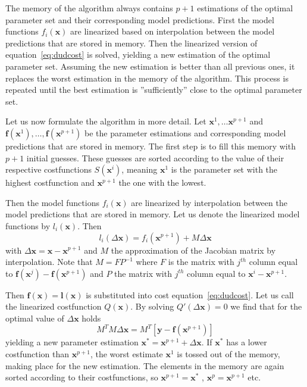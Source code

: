 The memory of the algorithm always contains $p + 1$ estimations of the optimal
parameter set and their corresponding model predictions. First the model
functions $f_i(\mathbf{x})$ are linearized based on interpolation between the
model predictions that are stored in memory. Then the linearized version of
equation~\ref{eq:dudcost} is solved, yielding a new estimation of the optimal
parameter set. Assuming the new estimation is better than all previous ones,
it replaces the worst estimation in the memory of the algorithm. This process
is repeated until the best estimation is ”sufficiently” close to the optimal
parameter set.

Let us now formulate the algorithm in more detail. Let $\mathbf{x}^1 , \ldots
\mathbf{x}^{p+1}$ and
$\mathbf{f}(\mathbf{x}^1), \ldots, \mathbf{f}(\mathbf{x}^{p+1})$ be the
parameter estimations and corresponding model predictions that are stored in
memory. The first step is to fill this memory with $p+1$ initial guesses. These
guesses are sorted according to the value of their respective costfunctions
$S(\mathbf{x}^i)$, meaning $\mathbf{x}^1$ is the parameter set with the highest
costfunction and $\mathbf{x}^{p+1}$ the one with the lowest.

Then the model functions $f_i(\mathbf{x})$ are linearized by interpolation
between the model predictions that are stored in memory. Let us denote the
linearized model functions by $l_i(\mathbf{x})$. Then
\begin{equation}
l_i (\Delta \mathbf{x}) = f_i(\mathbf{x}^{p+1}) + M \Delta \mathbf{x}
\end{equation}
with $\Delta \mathbf{x} = \mathbf{x} - \mathbf{x}^{p+1}$ and $M$ the
approximation of the Jacobian matrix by interpolation. Note that $M = F P^{−1}$
where $F$ is the matrix with $j^{th}$ column equal to $\mathbf{f}(\mathbf{x}^j)
- \mathbf{f}(\mathbf{x}^{p+1})$ and $P$ the matrix with $j^{th}$ column equal
to $\mathbf{x}^i - \mathbf{x}^{p+1}$.

Then $\mathbf{f}(\mathbf{x}) = \mathbf{l}(\mathbf{x})$ is substituted into cost
equation~\ref{eq:dudcost}. Let us call the linearized costfunction
$Q(\mathbf{x})$. By solving $Q'(\Delta \mathbf{x}) = 0$ we find that for the
optimal value of $\Delta \mathbf{x}$ holds
\begin{equation}
M^T M \Delta \mathbf{x} = M^T \left[\mathbf{y} - \mathbf{f}(\mathbf{x}^{p+1})\right]
\end{equation}
yielding a new parameter estimation $\mathbf{x}^\ast = \mathbf{x}^{p+1}
+ \Delta \mathbf{x}$. If $\mathbf{x}^\ast$ has a lower costfunction than
$\mathbf{x}^{p+1}$, the worst estimate $\mathbf{x}^1$ is tossed out of the
memory, making place for the new estimation. The elements in the memory are
again sorted according to their costfunctions, so $\mathbf{x}^{p+1}
= \mathbf{x}^\ast$ , $\mathbf{x}^p = \mathbf{x}^{p+1}$ etc.

